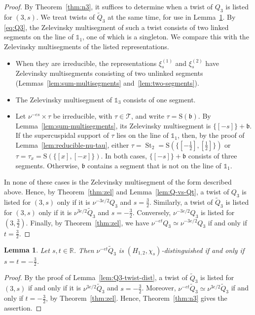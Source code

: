 \documentclass[11pt]{amsart}
\numberwithin{equation}{section}
\theoremstyle{plain}
\newtheorem{lemma}[theorem]{Lemma}
\theoremstyle{definition}
\theoremstyle{remark}
\newcommand{\R}{\mathbb{R}}
\newcommand{\one}{\mathds{1}}
\newcommand{\T}{\mathcal{T}}
\DeclareMathOperator{\St}{St}
\newcommand{\Qt}{\widetilde{Q}}
\newcommand{\xione}{\xi^{(1)}}
\newcommand{\xitwo}{\xi^{(2)}}
\newcommand{\bb}{\mathfrak{b}}
\newcommand{\Ss}{\mathrm{S}}
\begin{document}
\begin{proof}
	By Theorem~\ref{thm:n3}, it suffices to determine when a twist of $Q_3$ is listed for $(3,s)$. We treat twists of $\Qt_3$ at the same time, for use in Lemma~\ref{lem:Qt3-twist-dist}. By \eqref{eq:Q3}, the Zelevinsky multisegment of such a twist consists of two linked segments on the line of $\one_1$, one of which is a singleton. We compare this with the Zelevinsky multisegments of the listed representations.
	\begin{itemize}
		\item When they are irreducible, the representations $\xione_s$ and $\xitwo_s$ have Zelevinsky multisegments consisting of two unlinked segments (Lemmas~\ref{lem:sum-multisegments} and~\ref{lem:two-segments}).
		\item The Zelevinsky multisegment of $\one_3$ consists of one segment.
		\item Let $\nu^{-es}\times\tau$ be irreducible, with $\tau\in\T$, and write $\tau=\Ss(\bb)$. By Lemma~\ref{lem:sum-multisegments}, its Zelevinsky multisegment is $\{[-s]\}+\bb$. If the supercuspidal support of $\tau$ lies on the line of $\one_1$, then, by the proof of Lemma~\ref{lem:reducible-nu-tau}, either $\tau=\St_2=\Ss(\{[-\frac12],[\frac12]\})$ or $\tau=\tau_x=\Ss(\{[x],[-x]\})$. In both cases, $\{[-s]\}+\bb$ consists of three segments. Otherwise, $\bb$ contains a segment that is not on the line of $\one_1$.
	\end{itemize}
	In none of these cases is the Zelevinsky multisegment of the form described above. Hence, by Theorem~\ref{thm:zel} and Lemma~\ref{lem:Q-vs-Qt}, a twist of $Q_3$ is listed for $(3,s)$ only if it is $\nu^{-3e/2}Q_3$ and $s=\frac32$. Similarly, a twist of $\Qt_3$ is listed for $(3,s)$ only if it is $\nu^{3e/2}\Qt_3$ and $s=-\frac32$. Conversely, $\nu^{-3e/2}Q_3$ is listed for $(3,\frac32)$. Finally, by Theorem~\ref{thm:zel}, we have $\nu^{-et}Q_3\simeq\nu^{-3e/2}Q_3$ if and only if $t=\frac32$.
\end{proof}

\begin{lemma}\label{lem:Qt3-twist-dist}
	Let $s,t\in\R$. Then $\nu^{-et}\Qt_3$ is $(H_{1,2},\chi_s)$-distinguished if and only if $s=t=-\frac32$.
\end{lemma}

\begin{proof}
	By the proof of Lemma~\ref{lem:Q3-twist-dist}, a twist of $\Qt_3$ is listed for $(3,s)$ if and only if it is $\nu^{3e/2}\Qt_3$ and $s=-\frac32$. Moreover, $\nu^{-et}\Qt_3\simeq\nu^{3e/2}\Qt_3$ if and only if $t=-\frac32$, by Theorem~\ref{thm:zel}. Hence, Theorem~\ref{thm:n3} gives the assertion.
\end{proof}
\end{document}
